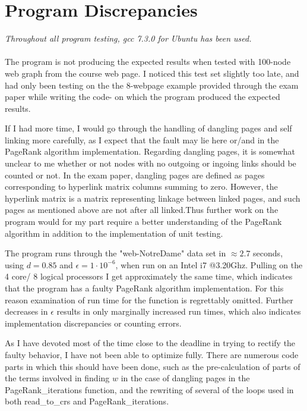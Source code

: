 \documentclass[%
oneside,                 %
final,                   %
10pt]{article}
\begin{document}
\section{Program Discrepancies}
\textit{Throughout all program testing, gcc 7.3.0 for Ubuntu has been used.}\paragraph{}
The program is not producing the expected results when tested with  100-node web graph from the course web page. I noticed this test set slightly too late, and had only been testing on the the 8-webpage example provided through the exam paper while writing the code- on which the program produced the expected results.  \par 
If I had more time, I would go through the handling of dangling pages and self linking more carefully, as I expect that the fault may lie here or/and in the PageRank algorithm implementation. Regarding dangling pages, it is somewhat unclear to me whether or not nodes with no outgoing or ingoing links should be counted or not. In the exam paper, dangling pages are defined as pages corresponding to hyperlink matrix columns summing to zero. However, the hyperlink matrix is a matrix representing linkage between linked pages, and such pages as mentioned above are not after all linked.Thus further work on the program would for my part require a better understanding of the PageRank algorithm in addition to the implementation of unit testing.   \par 
The program runs through the "web-NotreDame" data set in $\approx 2.7$ seconds, using $d=0.85$ and $\epsilon=1 \cdot 10^{-6}$, when run on an Intel i7 @3.20Ghz. Pulling on the 4 core/ 8 logical processors I get approximately the same time, which indicates that the program has a faulty PageRank algorithm implementation. For this reason examination of run time for the function is regrettably omitted. Further decreases in $\epsilon$ results in only marginally increased run times, which also indicates implementation discrepancies or counting errors. \par 
As I have devoted most of the time close to the deadline in trying to rectify the faulty behavior, I have not been able to optimize fully. There are numerous code parts in which this should have been done, such as the pre-calculation of parts of the terms involved in finding $w$ in the case of dangling pages in the PageRank\_iterations function, and the rewriting of several of the loops used in both read\_to\_crs and PageRank\_iterations.
\end{document}
